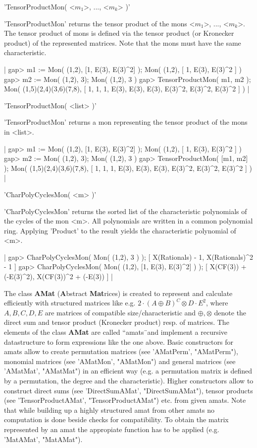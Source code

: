 'TensorProductMon( <$m_1$>, ..., <$m_k$> )'

'TensorProductMon' returns the tensor product of the mons 
<$m_1$>, ..., <$m_k$>. The tensor product of mons is defined via
the tensor product (or Kronecker product) of the represented matrices. 
Note that the mons must have the same characteristic.

|    gap> m1 := Mon( (1,2), [1, E(3), E(3)^2] );
    Mon(
      (1,2),
      [ 1, E(3), E(3)^2 ]
    )
    gap> m2 := Mon( (1,2), 3);
    Mon( (1,2), 3 )
    gap> TensorProductMon( m1, m2 );
    Mon(
      (1,5)(2,4)(3,6)(7,8),
      [ 1, 1, 1, E(3), E(3), E(3), E(3)^2, E(3)^2, E(3)^2 ]
    ) |

'TensorProductMon( <list> )'

'TensorProductMon' returns a mon representing the tensor product 
of the mons in <list>.

|    gap> m1 := Mon( (1,2), [1, E(3), E(3)^2] );
    Mon(
      (1,2),
      [ 1, E(3), E(3)^2 ]
    )
    gap> m2 := Mon( (1,2), 3);
    Mon( (1,2), 3 )
    gap> TensorProductMon( [m1, m2] );
    Mon(
      (1,5)(2,4)(3,6)(7,8),
      [ 1, 1, 1, E(3), E(3), E(3), E(3)^2, E(3)^2, E(3)^2 ]
    ) |


'CharPolyCyclesMon( <m> )'

'CharPolyCyclesMon' returns the sorted list of the characteristic
polynomials of the cycles of the mon <m>.  All polynomials are written
in a common polynomial ring.  Applying 'Product' to the result yields
the characteristic polynomial of <m>.

|    gap> CharPolyCyclesMon( Mon( (1,2), 3 ) );
    [ X(Rationals) - 1, X(Rationals)^2 - 1 ]
    gap> CharPolyCyclesMon( Mon( (1,2), [1, E(3), E(3)^2] ) );
    [ X(CF(3)) + (-E(3)^2), X(CF(3))^2 + (-E(3)) ] |


The class {\bf AMat} ({\bf A}bstract {\bf Mat}rices) 
is created to represent and calculate efficiently with 
structured matrices like e.g.
$2\cdot(A\oplus B)^C\otimes D\cdot E^2$, where $A, B, C, D, E$ are 
matrices of compatible size/characteristic and $\oplus, \otimes$ denote
the direct sum and tensor product (Kronecker product) resp.
of matrices. The elements of the class {\bf AMat} are called
``amats\"\ and implement a recursive datastructure to form
expressions like the one above. Basic constructors for amats
allow to create permutation matrices (see 'AMatPerm', "AMatPerm"), 
monomial matrices (see 'AMatMon', "AMatMon") and 
general matrices (see 'AMatMat', "AMatMat") in an efficient way (e.g. a
permutation matrix is defined by a permutation, the degree 
and the characteristic). Higher constructors allow to construct
direct sums (see 'DirectSumAMat', "DirectSumAMat"), 
tensor products (see 'TensorProductAMat', "TensorProductAMat") 
etc. from given amats. 
Note that while building up a highly structured amat from other amats 
no computation is done beside checks for compatibility. 
To obtain the matrix represented by an amat the appropiate
function has to be applied (e.g. 'MatAMat', "MatAMat").

